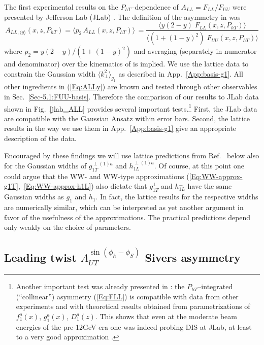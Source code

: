 \documentclass[a4paper,11pt]{article}
\newcommand{\be}{\begin{equation}}
\newcommand{\ee}{\end{equation}}
\newcommand{\la}{\langle}
\newcommand{\ra}{\rangle}
\def\Phperp{P_{hT}}
\def\kperp{k_\perp}
\begin{document}
The first experimental results on the 
$\Phperp$--dependence of $A_{LL} = F_{LL}/F_{UU}$ were presented by
Jefferson Lab (JLab) \cite{Avakian:2010ae}. The definition of the asymmetry 
in  \cite{Avakian:2010ae} was
\be\label{Eq:ALLy}
	A_{LL,\la y\ra}(x,z,\Phperp) 
	= \la p_2 \,A_{LL}(x,z,\Phperp) \ra \, 
	= \frac{\la y (2-y) \; F_{LL}(x,z,\Phperp)\ra}
	{\la(1+(1-y)^2) \; F_{UU}(x,z,\Phperp)\ra} 
\ee 
where $p_2 = y (2-y)/(1+(1-y)^2)$ and averaging (separately in numerator 
and denominator) over the kinematics of \cite{Avakian:2010ae} is implied. 
We use the lattice data \cite{Hagler:2009mb} to
constrain the Gaussian width $\la\kperp^2\ra_{g_1}$ as described in 
App.~\ref{App:basis-g1}. All other ingredients in (\ref{Eq:ALLy}) are known 
and tested through other observables in Sec.~\ref{Sec-5.1:FUU-basis}.
Therefore the comparison of our results to JLab data \cite{Avakian:2010ae} 
shown in Fig.~\ref{jlab_ALL} provides several important tests.\footnote{
	Another important test was already presented in 
	\cite{Avakian:2010ae}: the $\Phperp$--integrated (``collinear'')
	asymmetry (\ref{Eq:FLL}) is compatible with data
	from other experiments and with theoretical results obtained from
	parametrizations of $f_1^a(x)$, $g_1^a(x)$, $D_1^a(z)$. This 
	shows that even at the moderate beam energies of the pre-12GeV 
	era one was indeed probing DIS at JLab,
	at least to a very good approximation \cite{Avakian:2010ae}.}
First, the JLab data \cite{Avakian:2010ae} are compatible
with the Gaussian Ansatz within error bars. Second, the lattice results
in the way we use them in App.~\ref{App:basis-g1} give an appropriate 
description of the data.

Encouraged by these findings we will use lattice predictions from 
Ref.~\cite{Hagler:2009mb} below also for the Gaussian widths of 
$g_{1T}^{\perp(1)a}$ and $h_{1L}^{\perp(1)a}$.
Of course, at this point one could argue that the WW- and WW-type 
approximations (\ref{Eq:WW-approx-g1T},~\ref{Eq:WW-approx-h1L}) also
dictate that $g_{1T}^\perp$ and $h_{1L}^\perp$ have the same Gaussian
widths as $g_1$ and $h_1$. In fact, the lattice results for the 
respective widths are numerically similar, which can be interpreted as 
yet another argument in favor of the usefulness of the approximations. 
The practical predictions depend only weakly on the choice of parameters.

\newpage
\subsection{\boldmath Leading twist $A_{UT}^{\sin(\phi_h-\phi_S)}$ Sivers asymmetry}
\label{Sec-5.3:Sivers-basis}
\end{document}
